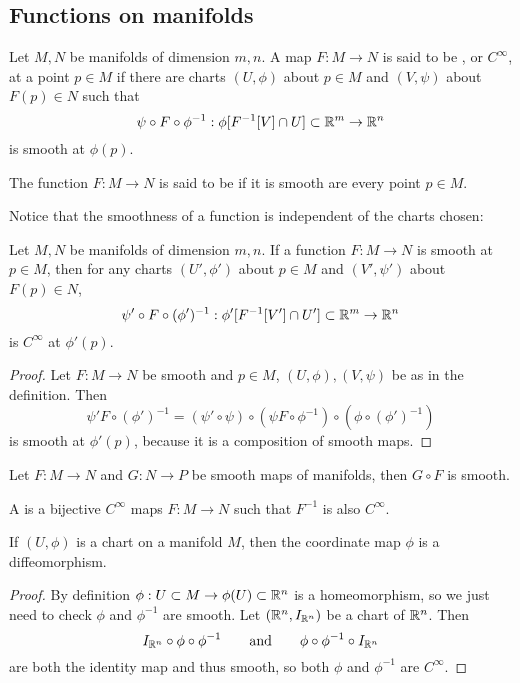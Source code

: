 \subsection{Functions on manifolds}
\begin{definition}
Let $M,N$ be manifolds of dimension $m,n$. A map $F: M \to N$ is said to be , or $C^\infty$, at a point $p\in M$ if there are charts $(U,\phi)$ about $p\in M$ and $(V,\psi)$ about $F(p) \in N$ such that
\[ \psi \circ F \circ \phi^{-1}: \phi[F^{-1}[V]\cap U]\subset \mathbb{R}^m \to \mathbb{R}^n \]
is smooth at $\phi(p)$.

The function $F: M\to N$ is said to be  if it is smooth are every point $p\in M$.
\end{definition}
Notice that the smoothness of a function is independent of the charts chosen:
\begin{lemma}
Let $M,N$ be manifolds of dimension $m,n$. If a function $F: M\to N$ is smooth at $p\in M$, then for any charts $(U',\phi')$ about $p\in M$ and $(V',\psi')$ about $F(p)\in N$,
\[ \psi'\circ F \circ (\phi')^{-1}: \phi'[F^{-1}[V']\cap U']\subset \mathbb{R}^m \to \mathbb{R}^n \]
is $C^\infty$ at $\phi'(p)$.
\end{lemma}
\begin{proof}
Let $F: M\to N$ be smooth and $p\in M$, $(U,\phi), (V,\psi)$ be as in the definition. Then
\[ \psi' F\circ (\phi')^{-1} = (\psi'\circ \psi)\circ(\psi F\circ \phi^{-1})\circ (\phi \circ (\phi')^{-1}) \]
is smooth at $\phi'(p)$, because it is a composition of smooth maps.
\end{proof}

\begin{lemma}
Let $F: M\to N$ and $G: N\to P$ be smooth maps of manifolds, then $G\circ F$ is smooth.
\end{lemma}

\begin{definition}
A  is a bijective $C^\infty$ maps $F:M\to N$ such that $F^{-1}$ is also $C^\infty$.
\end{definition}

\begin{lemma}
If $(U,\phi)$ is a chart on a manifold $M$, then the coordinate map $\phi$ is a diffeomorphism.
\end{lemma}
\begin{proof}
By definition $\phi: U \subset M \to \phi(U) \subset \mathbb{R}^n$ is a homeomorphism, so we just need to check $\phi$ and $\phi^{-1}$ are smooth.  Let $(\mathbb{R}^n, I_{\mathbb{R}^n})$ be a chart of $\mathbb{R}^n$. Then 
\[ I_{\mathbb{R}^n} \circ \phi \circ \phi^{-1} \qquad \text{and} \qquad \phi\circ \phi^{-1}\circ I_{\mathbb{R}^n} \]
are both the identity map and thus smooth, so both $\phi$ and $\phi^{-1}$ are $C^\infty$.
\end{proof}

